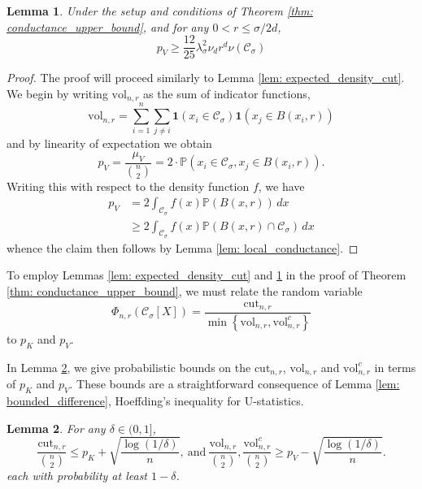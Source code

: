 \documentclass{article}
\newcommand{\set}[1]{\left\{#1\right\}}
\newcommand{\vol}{\mathrm{vol}}
\newcommand{\cut}{\mathrm{cut}}
\newcommand{\1}{\mathbf{1}}
\newcommand{\Xbf}{X}             %
\newcommand{\Pbb}{\mathbb{P}}
\newcommand{\Cset}{\mathcal{C}}
\newcommand{\Csig}{\Cset_{\sigma}}
\newcommand{\dx}{\,dx}
\theoremstyle{aldenthm}
\newtheorem{lemma}{Lemma}
\theoremstyle{aldenrmrk}
\begin{document}
\begin{lemma}
	\label{lem: expected_density_volume}
	Under the setup and conditions of Theorem \ref{thm: conductance_upper_bound}, and for any $0 < r \leq \sigma/2d$,
	\begin{equation*}
	p_V \geq \frac{12}{25} \lambda_{\sigma}^2 \nu_d r^d \nu(\Csig)
	\end{equation*}
\end{lemma}
\begin{proof}
	The proof will proceed similarly to Lemma \ref{lem: expected_density_cut}. We begin by writing $\vol_{n,r}$ as the sum of indicator functions,
	\begin{equation}
	\label{eqn: volume_expansion}
	\vol_{n,r} = \sum_{i = 1}^{n} \sum_{j \neq i} \1(x_i \in \Csig) \1(x_j \in B(x_i, r))
	\end{equation}
	and by linearity of expectation we obtain
	\begin{equation*}
	p_V = \frac{\mu_V}{{n \choose 2}} = 2 \cdot \Pbb(x_i \in \Csig, x_j \in B(x_i,r)). \tag{for any $i,j$, $i \neq j$. }
	\end{equation*}
	Writing this with respect to the density function $f$, we have
	\begin{align*}
	p_V & = 2 \int_{\Csig} f(x) \Pbb(B(x,r)) \dx \\
	& \geq 2 \int_{\Csig} f(x) \Pbb(B(x,r) \cap \Csig) \dx
	\end{align*}
	whence the claim then follows by Lemma \ref{lem: local_conductance}.
\end{proof}

To employ Lemmas \ref{lem: expected_density_cut} and \ref{lem: expected_density_volume} in the proof of Theorem \ref{thm: conductance_upper_bound}, we must relate the random variable
\begin{equation*}
\Phi_{n,r}(\Csig[\Xbf]) = \frac{\cut_{n,r}}{\min \set{\vol_{n,r}, \vol_{n,r}^c}}
\end{equation*}
to $p_K$ and $p_V$. 

In Lemma \ref{lem: prob_bound_cutvol}, we give probabilistic bounds on the $\cut_{n,r}$, $\vol_{n,r}$ and $\vol_{n,r}^c$ in terms of $p_K$ and $p_V$. These bounds are a straightforward consequence of Lemma \ref{lem: bounded_difference}, Hoeffding's inequality for U-statistics.

\begin{lemma}
	\label{lem: prob_bound_cutvol}
	For any $\delta \in (0,1]$,
	\begin{equation}
	\label{eqn: numerator_additive_bound}
	\frac{\cut_{n,r}}{{n \choose 2}} \leq p_K + \sqrt{\frac{\log(1/\delta)}{n}},~\text{and}~ \frac{\vol_{n,r}}{{n \choose 2}}, \frac{\vol_{n,r}^c}{{n \choose 2}}  \geq p_V - \sqrt{\frac{\log(1/\delta)}{n}}.
	\end{equation}
	each with probability at least $1 - \delta$. 
\end{lemma}
\end{document}
